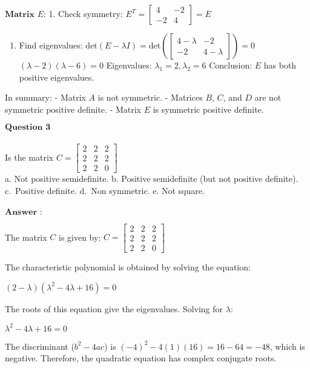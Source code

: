 \documentclass[11pt]{article}
\providecommand{\tightlist}{%
      \setlength{\itemsep}{0pt}\setlength{\parskip}{0pt}}
\begin{document}
$\textbf{Matrix $E$:}$ 1. Check symmetry:
$E^T = \begin{bmatrix} 4 & -2 \\ -2 & 4 \end{bmatrix} = E$

\begin{enumerate}
\def\labelenumi{\arabic{enumi}.}
\setcounter{enumi}{1}
\tightlist
\item
  Find eigenvalues:
  $\text{det}(E - \lambda I) = \text{det}\left(\begin{bmatrix} 4-\lambda & -2 \\ -2 & 4-\lambda \end{bmatrix}\right) = 0$
  $(\lambda - 2)(\lambda - 6) = 0$ Eigenvalues:
  $\lambda_1 = 2, \lambda_2 = 6$ Conclusion: $E$ has both positive
  eigenvalues.
\end{enumerate}

In summary: - Matrix $A$ is not symmetric. - Matrices $B$, $C$,
and $D$ are not symmetric positive definite. - Matrix $E$ is
symmetric positive definite.

    $\textbf{Question 3}$\\
~\\
Is the matrix
$C=\begin{bmatrix} 2 & 2 & 2 \\ 2 & 2 & 2 \\ 2 & 2 & 0 \end{bmatrix}$\\
a. Not positive semidefinite. b. Positive semidefinite (but not positive
definite). c.~Positive definite. d.~Non symmetric. e. Not square.\\
~\\
$\textbf{Answer :}$

    The matrix $C $ is given by: $ C =
\begin{bmatrix} 2 & 2 & 2 \\ 2 & 2 & 2 \\ 2 & 2 & 0 \end{bmatrix}
$

The characteristic polynomial is obtained by solving the equation:

$ (2-\lambda)(\lambda^2 - 4\lambda + 16) = 0 $

The roots of this equation give the eigenvalues. Solving for
$\lambda $:

$ \lambda^2 - 4\lambda + 16 = 0 $

The discriminant ($b^2 - 4ac $) is $(-4)^2 - 4(1)(16) = 16 - 64
= -48 $, which is negative. Therefore, the quadratic equation has
complex conjugate roots.
\end{document}
